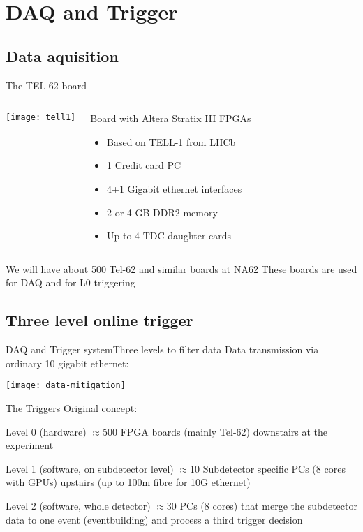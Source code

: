 \section{DAQ and Trigger}
\subsection{Data aquisition}
\begin{frame}{The TEL-62 board}{}
	\begin{columns}
			\texttt{[image: tell1]}
			\begin{block}{Board with Altera Stratix III FPGAs}
				\begin{itemize}
				  \item Based on TELL-1 from LHCb
				  \item 1 Credit card PC
				  \item 4+1 Gigabit ethernet interfaces
				  \item 2 or 4 GB DDR2 memory
				  \item Up to 4 TDC daughter cards
				\end{itemize}
			\end{block}
	\end{columns}
	\begin{block}{We will have about 500 Tel-62 and similar boards at NA62}
		These boards are used for DAQ and for L0 triggering
	\end{block}
\end{frame}

\subsection{Three level online trigger}
\begin{frame}{DAQ and Trigger system}{Three levels to filter data}
	Data transmission via ordinary 10 gigabit ethernet:
	\begin{center} 
		\texttt{[image: data-mitigation]}
	\end{center}
\end{frame}

\begin{frame}{The Triggers}{}
	Original concept:
	\begin{block}{Level 0 (hardware)}
		$\approx$500 FPGA boards (mainly Tel-62) downstairs at the experiment
	\end{block}
	\begin{block}{Level 1 (software, on subdetector level)}
		$\approx$10 Subdetector specific PCs (8 cores with GPUs) upstairs (up to 100m
		fibre for 10G ethernet)
	\end{block}
	\begin{block}{Level 2 (software, whole detector)}
		$\approx$30 PCs (8 cores) that merge the subdetector data to one event
		(eventbuilding) and process a third trigger decision
	\end{block}
\end{frame}

